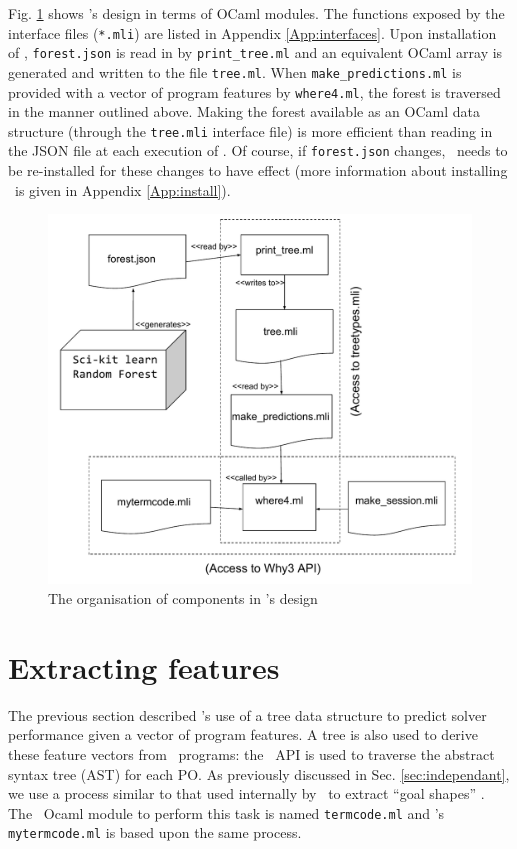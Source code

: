 Fig. \ref{fig:Chapter5} shows \where's design in terms of OCaml modules.
The functions exposed by the interface files (\texttt{*.mli}) are listed in Appendix \ref{App:interfaces}. 
Upon installation of \where, \texttt{forest.json} is read in by \texttt{print\_tree.ml} and an equivalent OCaml array is generated and written to the file \texttt{tree.ml}.
When \texttt{make\_predictions.ml} is provided with a vector of program features by \texttt{where4.ml}, the forest is traversed  in the manner outlined above.
Making the forest available as an OCaml data structure (through the \texttt{tree.mli} interface file) is more efficient than reading in the JSON file at each execution of \where.
Of course, if \texttt{forest.json} changes, \where~needs to be re-installed for these changes to have effect (more information about installing \where~is given in Appendix \ref{App:install}).  


\begin{figure}
	\centering
	\includegraphics[width=1.0\linewidth]{Figures/Chapter5_stereo}
	\caption[\where~modules]{The organisation of components in \where's design}
	\label{fig:Chapter5}
\end{figure}

\section{Extracting features}

The previous section described \where's use of a tree data structure to predict solver performance given a vector of program features.
A tree is also used to derive these feature vectors from \why~programs: the \why~API is used to traverse the abstract syntax tree (AST) for each PO.
As previously discussed in Sec. \ref{sec:independant}, we use a process similar to that used internally by \why~to extract ``goal shapes'' \cite{why:preserving}.
The \why~Ocaml module to perform this task is named \texttt{termcode.ml} and \where's \texttt{mytermcode.ml} is based upon the same process.

